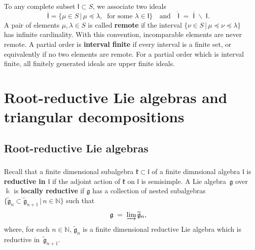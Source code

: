 \documentclass[11pt]{amsart}
\newcommand{\III}{\mathsf{I}}
\newcommand{\mk}{\Bbbk}
\newcommand{\fg}{\mathfrak{g}}
\newcommand{\fk}{\mathfrak{k}}
\newcommand{\fl}{\mathfrak{l}}
\newcommand{\mN}{\mathbb{N}}
\numberwithin{equation}{section}
\theoremstyle{plain}
\theoremstyle{remark}
\theoremstyle{remark}
\theoremstyle{construction}
\begin{document}
\subsubsection{}\label{Complete2}To any complete subset $\III\subset S$, we associate two ideals
$$\overline{\III}=\{\mu\in S\,|\, \mu\preceq \lambda,\;\;\mbox{for some $\lambda\in\III $}\}\quad\mbox{and}\quad \mathring{\III}\;=\;\overline{\III}\;\backslash\;\III.$$
A pair of elements {$\mu, \lambda\in S$} is called {\bf remote} if the interval $\{\nu\in S\,|\,\mu\preceq\nu\preceq \lambda\}$ has infinite cardinality. With this convention, incomparable elements are never remote.
A partial order is {\bf interval finite} if every interval is a finite set, or equivalently if no two elements are remote. For a partial order which is interval finite, all finitely generated ideals are upper finite ideals.




\section{Root-reductive Lie algebras and triangular decompositions}

\subsection{Root-reductive Lie algebras}

\subsubsection{}{Recall that a finite dimensional subalgebra $\fk\subset\fl$ of a finite dimnsional algebra $\fl$ is {\bf reductive in $\fl$} if the adjoint action of $\fk$ on $\fl$ is semisimple.}
\label{LocRed} A Lie algebra~$\fg$ over $\mk$ is {\bf locally reductive} if ${\fg}$ has a collection of {nested} subalgebras~$\{\widetilde{\fg}_n{\subset\widetilde{\fg}_{n+1}}\,|\,n\in\mN\}$
such that
$$\fg\;=\;\varinjlim \widetilde{\fg}_n,$$
where, for each $n\in\mN$, $\widetilde{\fg}_n$ is a {finite dimensional} reductive Lie algebra which is reductive in~$\widetilde{\fg}_{n+1}$.
\end{document}
